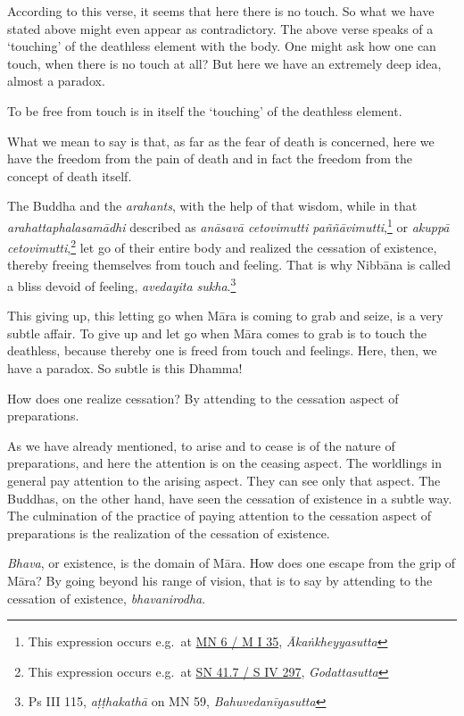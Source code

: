According to this verse, it seems that here there is no touch. So what we have stated above might even appear as contradictory. The above verse speaks of a `touching' of the deathless element with the body. One might ask how one can touch, when there is no touch at all? But here we have an extremely deep idea, almost a paradox.

To be free from touch is in itself the `touching' of the deathless element.

What we mean to say is that, as far as the fear of death is concerned, here we have the freedom from the pain of death and in fact the freedom from the concept of death itself.

The Buddha and the \emph{arahants}, with the help of that wisdom, while in that \emph{arahattaphalasamādhi} described as \emph{anāsavā cetovimutti paññāvimutti},\footnote{This expression occurs e.g.~at \href{https://suttacentral.net/mn6/pli/ms}{MN 6 / M I 35}, \emph{Ākaṅkheyyasutta}} or \emph{akuppā cetovimutti},\footnote{This expression occurs e.g.~at \href{https://suttacentral.net/sn41.7/pli/ms}{SN 41.7 / S IV 297}, \emph{Godattasutta}} let go of their entire body and realized the cessation of existence, thereby freeing themselves from touch and feeling. That is why Nibbāna is called a bliss devoid of feeling, \emph{avedayita sukha}.\footnote{Ps III 115, \emph{aṭṭhakathā} on MN 59, \emph{Bahuvedanīyasutta}}

This giving up, this letting go when Māra is coming to grab and seize, is a very subtle affair. To give up and let go when Māra comes to grab is to touch the deathless, because thereby one is freed from touch and feelings. Here, then, we have a paradox. So subtle is this Dhamma!

How does one realize cessation? By attending to the cessation aspect of preparations.

As we have already mentioned, to arise and to cease is of the nature of preparations, and here the attention is on the ceasing aspect. The worldlings in general pay attention to the arising aspect. They can see only that aspect. The Buddhas, on the other hand, have seen the cessation of existence in a subtle way. The culmination of the practice of paying attention to the cessation aspect of preparations is the realization of the cessation of existence.

\emph{Bhava}, or existence, is the domain of Māra. How does one escape from the grip of Māra? By going beyond his range of vision, that is to say by attending to the cessation of existence, \emph{bhavanirodha}.

